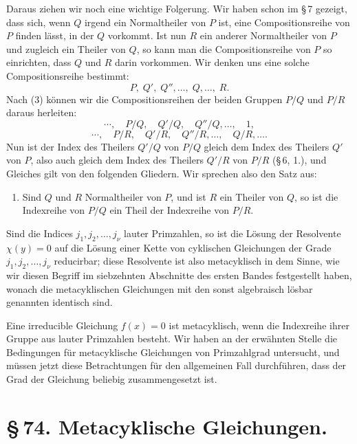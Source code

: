 \documentclass[11pt]{article}
\begin{document}
Daraus ziehen wir noch eine wichtige Folgerung. Wir haben schon im \S\,7 gezeigt, dass sich, wenn $Q$ irgend ein Normaltheiler von $P$ ist, eine Compositionsreihe von $P$ finden lässt, in der $Q$ vorkommt. Ist nun $R$ ein anderer Normaltheiler von $P$ und zugleich ein Theiler von $Q$, so kann man die Compositionsreihe von $P$ so einrichten, dass $Q$ und $R$ darin vorkommen. Wir denken uns eine solche Compositionsreihe bestimmt:
\begin{equation}
 P,\;Q',\;Q'',\ldots,\;Q,\ldots,\;R.
 \tag{4}
\end{equation}
Nach (3) können wir die Compositionsreihen der beiden Gruppen $P/Q$ und $P/R$ daraus herleiten:
\begin{equation}
 \cdots,\quad P/Q,\quad Q'/Q,\quad Q''/Q,\ldots,\quad 1,
 \tag{5}
\end{equation}
\begin{equation}
 \cdots,\quad P/R,\quad Q'/R,\quad Q''/R,\ldots,\quad Q/R,\ldots .
 \tag{6}
\end{equation}
Nun ist der Index des Theilers $Q'/Q$ von $P/Q$ gleich dem Index des Theilers $Q'$ von $P$, also auch gleich dem Index des Theilers $Q'/R$ von $P/R$ (\S\,6, 1.), und Gleiches gilt von den folgenden Gliedern. Wir sprechen also den Satz aus:

\begin{enumerate}[label=\arabic*.,leftmargin=2.6em,start=3]
\item Sind $Q$ und $R$ Normaltheiler von $P$, und ist $R$ ein Theiler von $Q$, so ist die Indexreihe von $P/Q$ ein Theil der Indexreihe von $P/R$.
\end{enumerate}

Sind die Indices $j_1,j_2,\ldots,j_\nu$ lauter Primzahlen, so ist die Lösung der Resolvente $\chi(y)=0$ auf die Lösung einer Kette von cyklischen Gleichungen der Grade $j_1,j_2,\ldots,j_\nu$ reducirbar; diese Resolvente ist also metacyklisch in dem Sinne, wie wir diesen Begriff im siebzehnten Abschnitte des ersten Bandes festgestellt haben, wonach die metacyklischen Gleichungen mit den sonst algebraisch lösbar genannten identisch sind.

Eine irreducible Gleichung $f(x)=0$ ist metacyklisch, wenn die Indexreihe ihrer Gruppe aus lauter Primzahlen besteht. Wir haben an der erwähnten Stelle die Bedingungen für metacyklische Gleichungen von Primzahlgrad untersucht, und müssen jetzt diese Betrachtungen für den allgemeinen Fall durchführen, dass der Grad der Gleichung beliebig zusammengesetzt ist.

\section*{\S\,74. Metacyklische Gleichungen.}
\end{document}
